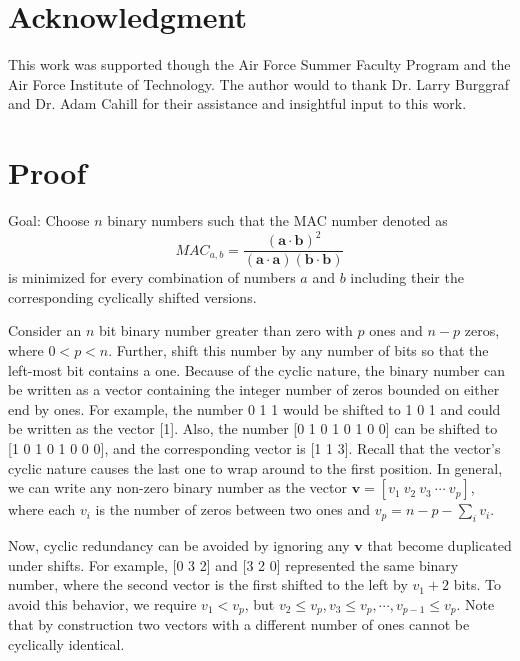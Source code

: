 \documentclass[3p,times]{elsarticle}
\begin{document}
\section{Acknowledgment}
This work was supported though the Air Force Summer Faculty Program and the Air Force Institute of Technology.  The author would to thank Dr. Larry Burggraf and Dr. Adam Cahill for their assistance and insightful input to this work.

\appendix

\section{Proof}

Goal: Choose $n$ binary numbers such that the MAC number denoted as 
\begin{equation}
MAC_{a,b}=\frac{\left(\mathbf{a}\cdot\mathbf{b}\right)^2}{\left(\mathbf{a}\cdot\mathbf{a}\right)\left(\mathbf{b}\cdot\mathbf{b}\right)}
\end{equation}
is minimized for every combination of numbers $a$ and $b$ including their the corresponding cyclically shifted versions.

Consider an $n$ bit binary number greater than zero with $p$ ones and $n-p$ zeros, where $0<p<n$.  Further, shift this number by any number of bits so that the left-most bit contains a one.  
Because of the cyclic nature, the binary number can be written as a vector containing the integer number of zeros bounded on either end by ones.  For example, the number 0 1 1 would be shifted to 1 0 1 and could be written as the vector [1].  Also, the number [0 1 0 1 0 1 0 0] can be shifted to [1 0 1 0 1 0 0 0], and the corresponding vector is [1 1 3].  Recall that the vector's cyclic nature causes the last one to wrap around to the first 
position.  In general, we can write any non-zero binary number as the vector $\textbf{v}=\left[v_1\ v_2\ v_3\ \cdots\ v_p\right]$, where each $v_i$ is the number of zeros between two ones and $v_p=n-p-\sum\limits_{i} v_i$.  

Now, cyclic redundancy can be avoided by ignoring any $\textbf{v}$ that become duplicated under shifts.  For example, [0 3 2] and [3 2 0] represented the same binary number, where the second vector is the first shifted to the left by $v_1+2$ bits.  To avoid this behavior, we require $v_{1}<v_p$, but $v_2\le v_p, v_3\le v_p, \cdots, v_{p-1}\le v_p$.  Note that by construction two vectors with a different number of ones cannot be cyclically identical.
\end{document}
